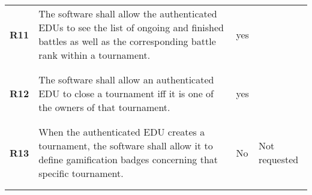\begin{longtable}[H]{l p{8cm} l p{2cm}}
    \textbf{R11} & The software shall allow the authenticated EDUs to see the list of ongoing and finished battles as well as the corresponding battle rank within a tournament.                                                                                                            & {\color{green}yes}   &                                                                                         \\
                 &                                                                                                                                                                                                                                                                          &                      &                                                                                         \\\hline & & & \\
    \textbf{R12} & The software shall allow an authenticated EDU to close a tournament iff it is one of the owners of that tournament.                                                                                                                                                      & {\color{green}yes}   &                                                                                         \\
                 &                                                                                                                                                                                                                                                                          &                      &                                                                                         \\\hline & & & \\
    \textbf{R13} & When the authenticated EDU creates a tournament, the software shall allow it to define gamification badges concerning that specific tournament.                                                                                                                          & No                   & Not requested                                                                           \\
                 &                                                                                                                                                                                                                                                                          &                      &                                                                                         \\\hline & & & \\

\end{longtable}
